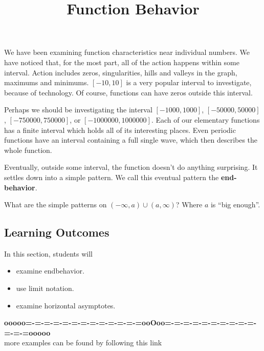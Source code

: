 \documentclass{ximera}
\title{Function Behavior}
\begin{document}
\begin{abstract}
\end{abstract}
\maketitle




We have been examining function characteristics near individual numbers. We have noticed that, for the most part, all of the action happens within some interval.  Action includes zeros, singularities, hills and valleys in the graph, maximums and minimums.  $[-10, 10]$  is a very popular interval to investigate, because of technology.  Of course, functions can have zeros outside this interval.  

Perhaps we should be investigating the interval $[-1000, 1000]$, $[-50000, 50000]$, $[-750000, 750000]$, or $[-1000000, 1000000]$. Each of our elementary functions has a finite interval which holds all of its interesting places.  Even periodic functions have an interval containing a full single wave, which then describes the whole function.

Eventually, outside some interval, the function doesn't do anything surprising.  It settles down into a simple pattern.  We call this eventual pattern the \textbf{\textcolor{purple!85!blue}{end-behavior}}.



What are the simple patterns on $(-\infty, a) \cup (a, \infty)$?  Where $a$ is ``big enough''.








\subsection{Learning Outcomes}


\begin{sectionOutcomes}
In this section, students will 

\begin{itemize}
\item examine endbehavior.
\item use limit notation.
\item examine horizontal asymptotes.
\end{itemize}
\end{sectionOutcomes}










\begin{center}
\textbf{\textcolor{green!50!black}{ooooo=-=-=-=-=-=-=-=-=-=-=-=-=ooOoo=-=-=-=-=-=-=-=-=-=-=-=-=ooooo}} \\

more examples can be found by following this link\\ 

\end{center}
\end{document}
